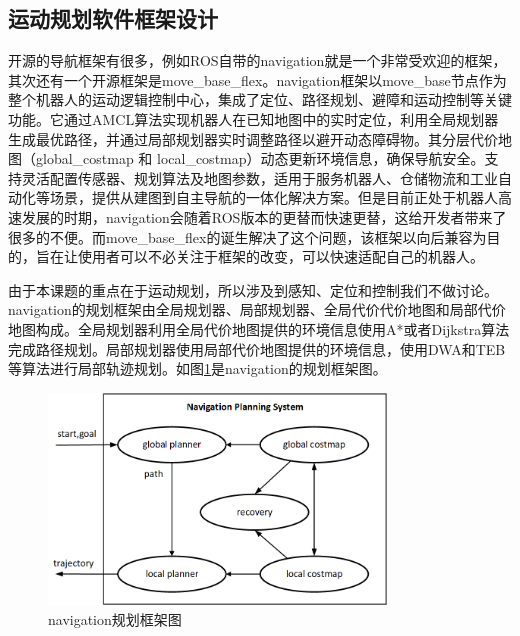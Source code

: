 \documentclass[master,academic]{ysuthesis} %
\begin{document}
	\subsection{运动规划软件框架设计}
	开源的导航框架有很多，例如ROS自带的navigation就是一个非常受欢迎的框架，其次还有一个开源框架是move\_base\_flex。navigation框架以move\_base节点作为整个机器人的运动逻辑控制中心，集成了定位、路径规划、避障和运动控制等关键功能。它通过​AMCL算法实现机器人在已知地图中的实时定位，利用​全局规划器生成最优路径，并通过局部规划器​实时调整路径以避开动态障碍物。其分层代价地图（global\_costmap 和 local\_costmap）动态更新环境信息，确保导航安全。支持灵活配置传感器、规划算法及地图参数，适用于服务机器人、仓储物流和工业自动化等场景，提供从建图到自主导航的一体化解决方案。但是目前正处于机器人高速发展的时期，navigation会随着ROS版本的更替而快速更替，这给开发者带来了很多的不便。而move\_base\_flex的诞生解决了这个问题，该框架以向后兼容为目的，旨在让使用者可以不必关注于框架的改变，可以快速适配自己的机器人。
	
	由于本课题的重点在于运动规划，所以涉及到感知、定位和控制我们不做讨论。navigation的规划框架由全局规划器、局部规划器、全局代价代价地图和局部代价地图构成。全局规划器利用全局代价地图提供的环境信息使用A*或者Dijkstra算法完成路径规划。局部规划器使用局部代价地图提供的环境信息，使用DWA和TEB等算法进行局部轨迹规划。如图\ref{fig:navigation规划框架图}是navigation的规划框架图。
	\begin{figure}[!ht]
		\centering
		\includegraphics[width=0.8\textwidth]{navigation规划框架.png}
		\caption{navigation规划框架图}
		\label{fig:navigation规划框架图}
	\end{figure}
\end{document}
